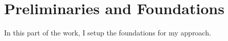 \chapter{Preliminaries and Foundations}
\label{ch:preliminaries}

In this part of the work, I setup the foundations for my approach.

%


%
%